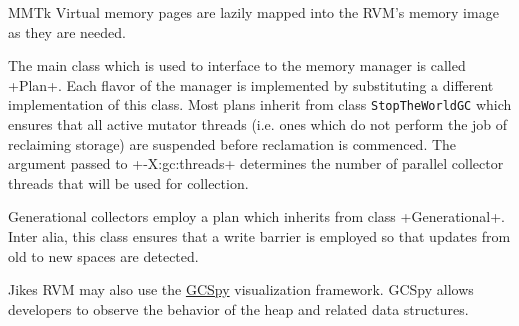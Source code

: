 \begin{section}{MMTk}
Virtual memory pages are lazily mapped into the RVM's memory image as they are needed.

The main class which is used to interface to the memory manager is called \spverb+Plan+. Each flavor of the manager is implemented by substituting a different implementation of this class. Most plans inherit from class \texttt{Stop\-The\-World\-GC} which ensures that all active mutator threads (i.e. ones which do not perform the job of reclaiming storage) are suspended before reclamation is commenced. The argument passed to \spverb+-X:gc:threads+ determines the number of parallel collector threads that will be used for collection.

Generational collectors employ a plan which inherits from class \spverb+Generational+. Inter alia, this class ensures that a write barrier is employed so that updates from old to new spaces are detected.

Jikes RVM may also use the \hyperref[sec:usinggcspy]{GCSpy} visualization framework. GCSpy allows developers to observe the behavior of the heap and related data structures.

\end{section}
